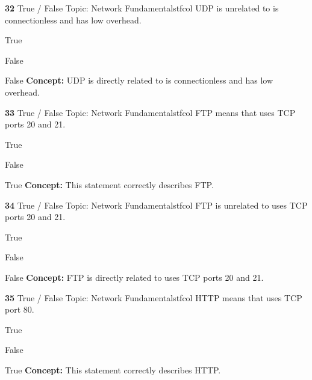 \documentclass[10pt,a4paper]{article}
\begin{document}
\begin{qcard}{\color{white}\textbf{32} \hfill \small True / False \textbar{} Topic: Network Fundamentals}{tfcol}
UDP is unrelated to is connectionless and has low overhead.

\begin{qoptions}
\item True
\item False
\end{qoptions}
\begin{explainbox}{False}
\textbf{Concept:} UDP is directly related to is connectionless and has low overhead.
\end{explainbox}
\end{qcard}

\begin{qcard}{\color{white}\textbf{33} \hfill \small True / False \textbar{} Topic: Network Fundamentals}{tfcol}
FTP means that uses TCP ports 20 and 21.

\begin{qoptions}
\item True
\item False
\end{qoptions}
\begin{explainbox}{True}
\textbf{Concept:} This statement correctly describes FTP.
\end{explainbox}
\end{qcard}

\begin{qcard}{\color{white}\textbf{34} \hfill \small True / False \textbar{} Topic: Network Fundamentals}{tfcol}
FTP is unrelated to uses TCP ports 20 and 21.

\begin{qoptions}
\item True
\item False
\end{qoptions}
\begin{explainbox}{False}
\textbf{Concept:} FTP is directly related to uses TCP ports 20 and 21.
\end{explainbox}
\end{qcard}

\begin{qcard}{\color{white}\textbf{35} \hfill \small True / False \textbar{} Topic: Network Fundamentals}{tfcol}
HTTP means that uses TCP port 80.

\begin{qoptions}
\item True
\item False
\end{qoptions}
\begin{explainbox}{True}
\textbf{Concept:} This statement correctly describes HTTP.
\end{explainbox}
\end{qcard}
\end{document}
